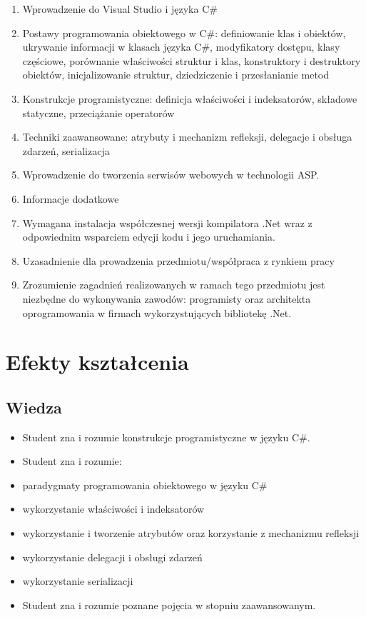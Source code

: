 \documentclass[12pt, a4paper]{article}
\begin{document}
\begin{enumerate}
  \item Wprowadzenie do Visual Studio i języka C\#
  \item Postawy programowania obiektowego w C\#: definiowanie klas i obiektów, ukrywanie informacji w klasach języka C\#, modyfikatory dostępu, klasy częściowe, porównanie właściwości struktur i klas, konstruktory i destruktory obiektów, inicjalizowanie struktur, dziedziczenie i przesłanianie metod
  \item Konstrukcje programistyczne: definicja właściwości i indeksatorów, składowe statyczne, przeciążanie operatorów
  \item Techniki zaawansowane: atrybuty i mechanizm refleksji, delegacje i obsługa zdarzeń, serializacja
  \item Wprowadzenie do tworzenia serwisów webowych w technologii ASP.
  \item Informacje dodatkowe
  \item Wymagana instalacja współczesnej wersji kompilatora .Net wraz z odpowiednim wsparciem edycji kodu i jego uruchamiania.
  \item Uzasadnienie dla prowadzenia przedmiotu/współpraca z rynkiem pracy
  \item Zrozumienie zagadnień realizowanych w ramach tego przedmiotu jest niezbędne do wykonywania zawodów: programisty oraz architekta oprogramowania w firmach wykorzystujących bibliotekę .Net.
\end{enumerate}

\section{Efekty kształcenia}

\subsection*{Wiedza}
\begin{itemize}
  \item Student zna i rozumie konstrukcje programistyczne w języku C\#.
  \item Student zna i rozumie:
  \item paradygmaty programowania obiektowego w języku C\#
  \item wykorzystanie właściwości i indeksatorów
  \item wykorzystanie i tworzenie atrybutów oraz korzystanie z mechanizmu refleksji
  \item wykorzystanie delegacji i obsługi zdarzeń
  \item wykorzystanie serializacji
  \item Student zna i rozumie poznane pojęcia w stopniu zaawansowanym.
\end{itemize}
\end{document}
